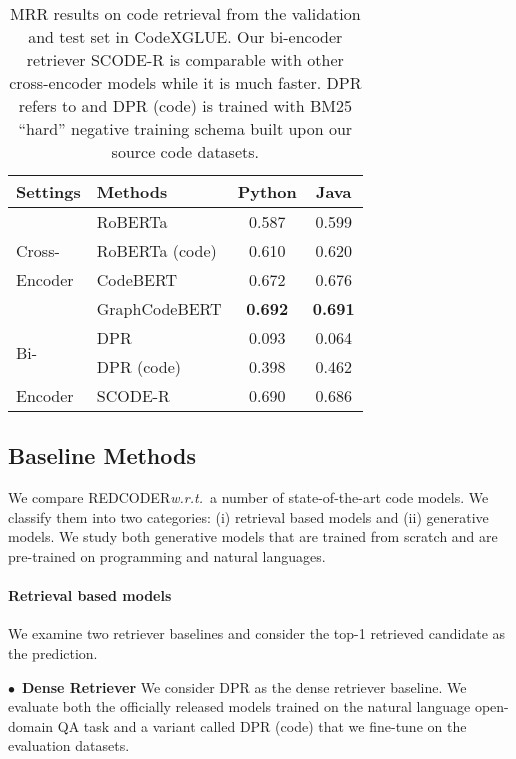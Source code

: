 \documentclass[11pt]{article}
\newcommand{\tool}{{REDCODER}\xspace}
\newcommand{\coder}{SCODE-R\xspace}
\newcommand{\wrt}{\textit{w.r.t.}~}
\begin{document}
 \begin{table}[t]
\centering
\begin{tabular}{l|l|c|c}
\hline
Settings & Methods & Python & Java \\
\hline
 & RoBERTa & 0.587	& 0.599 \\
Cross- & RoBERTa (code) & 0.610 & 0.620 \\
Encoder & CodeBERT & 	0.672 & 	0.676 \\
& GraphCodeBERT & {\bf 0.692} & {\bf 0.691} \\
\hline
\multirow{2}{*}{Bi-} & DPR & 0.093 & 0.064 \\
& DPR (code) & 0.398 & 0.462 \\
\multirow{-2}{*}{Encoder}& \coder & 0.690 & 0.686\\
\hline
\end{tabular}
\caption{
MRR results on code retrieval from the validation and test set in CodeXGLUE. Our bi-encoder retriever \coder is comparable with other cross-encoder models while it is much faster. DPR refers to \citet{karpukhin-etal-2020-dense} and DPR (code) is trained with BM25 ``hard'' negative training schema built upon our source code datasets.
}
\label{table:code_mrr}
\vspace{-2mm}
\end{table}


 


\subsection{Baseline Methods}
We compare \tool \wrt a number of  state-of-the-art code models. We classify them into two categories: (i) retrieval based models and (ii) generative models. 
We study both generative models that are trained from scratch and are pre-trained on programming and natural languages.




\paragraph{Retrieval based models}
We examine two retriever baselines and consider the top-1 retrieved candidate as the prediction.


\noindent$\bullet$~\textbf{Dense Retriever\hspace{0.5em}} 
We consider DPR as the dense retriever baseline. 
We evaluate both the officially released models trained on the natural language open-domain QA task and a variant called DPR (code) that we fine-tune on the evaluation datasets.
\end{document}
